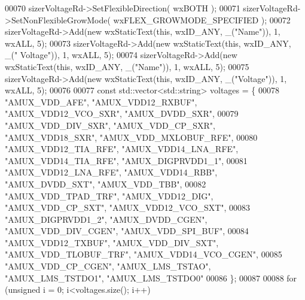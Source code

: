 \begin{DoxyCode}
00070     sizerVoltageRd->SetFlexibleDirection( wxBOTH );
00071     sizerVoltageRd->SetNonFlexibleGrowMode( wxFLEX\_GROWMODE\_SPECIFIED );
00072     sizerVoltageRd->Add(\textcolor{keyword}{new} wxStaticText(\textcolor{keyword}{this}, wxID\_ANY, \_(\textcolor{stringliteral}{"Name"})), 1, wxALL, 5);
00073     sizerVoltageRd->Add(\textcolor{keyword}{new} wxStaticText(\textcolor{keyword}{this}, wxID\_ANY, \_(\textcolor{stringliteral}{" Voltage"})), 1, wxALL, 5);
00074     sizerVoltageRd->Add(\textcolor{keyword}{new} wxStaticText(\textcolor{keyword}{this}, wxID\_ANY, \_(\textcolor{stringliteral}{"Name"})), 1, wxALL, 5);
00075     sizerVoltageRd->Add(\textcolor{keyword}{new} wxStaticText(\textcolor{keyword}{this}, wxID\_ANY, \_(\textcolor{stringliteral}{"Voltage"})), 1, wxALL, 5);
00076 
00077     \textcolor{keyword}{const} std::vector<std::string> voltages = \{
00078         \textcolor{stringliteral}{"AMUX\_VDD\_AFE"}, \textcolor{stringliteral}{"AMUX\_VDD12\_RXBUF"}, \textcolor{stringliteral}{"AMUX\_VDD12\_VCO\_SXR"}, \textcolor{stringliteral}{"AMUX\_DVDD\_SXR"},
00079         \textcolor{stringliteral}{"AMUX\_VDD\_DIV\_SXR"}, \textcolor{stringliteral}{"AMUX\_VDD\_CP\_SXR"}, \textcolor{stringliteral}{"AMUX\_VDD18\_SXR"}, \textcolor{stringliteral}{"AMUX\_VDD\_MXLOBUF\_RFE"},
00080         \textcolor{stringliteral}{"AMUX\_VDD12\_TIA\_RFE"}, \textcolor{stringliteral}{"AMUX\_VDD14\_LNA\_RFE"}, \textcolor{stringliteral}{"AMUX\_VDD14\_TIA\_RFE"}, \textcolor{stringliteral}{"AMUX\_DIGPRVDD1\_1"},
00081         \textcolor{stringliteral}{"AMUX\_VDD12\_LNA\_RFE"}, \textcolor{stringliteral}{"AMUX\_VDD14\_RBB"}, \textcolor{stringliteral}{"AMUX\_DVDD\_SXT"}, \textcolor{stringliteral}{"AMUX\_VDD\_TBB"},
00082         \textcolor{stringliteral}{"AMUX\_VDD\_TPAD\_TRF"}, \textcolor{stringliteral}{"AMUX\_VDD12\_DIG"}, \textcolor{stringliteral}{"AMUX\_VDD\_CP\_SXT"}, \textcolor{stringliteral}{"AMUX\_VDD12\_VCO\_SXT"},
00083         \textcolor{stringliteral}{"AMUX\_DIGPRVDD1\_2"}, \textcolor{stringliteral}{"AMUX\_DVDD\_CGEN"}, \textcolor{stringliteral}{"AMUX\_VDD\_DIV\_CGEN"}, \textcolor{stringliteral}{"AMUX\_VDD\_SPI\_BUF"},
00084         \textcolor{stringliteral}{"AMUX\_VDD12\_TXBUF"}, \textcolor{stringliteral}{"AMUX\_VDD\_DIV\_SXT"}, \textcolor{stringliteral}{"AMUX\_VDD\_TLOBUF\_TRF"}, \textcolor{stringliteral}{"AMUX\_VDD14\_VCO\_CGEN"},
00085         \textcolor{stringliteral}{"AMUX\_VDD\_CP\_CGEN"}, \textcolor{stringliteral}{"AMUX\_LMS\_TSTAO"}, \textcolor{stringliteral}{"AMUX\_LMS\_TSTDO1"}, \textcolor{stringliteral}{"AMUX\_LMS\_TSTDO0"}
00086     \};
00087 
00088     \textcolor{keywordflow}{for} (\textcolor{keywordtype}{unsigned} i = 0; i<voltages.size(); i++)

\end{DoxyCode}

